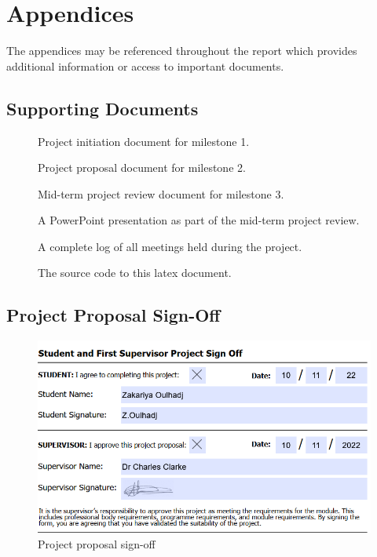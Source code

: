 \documentclass[11pt]{article}
\begin{document}
\clearpage



\clearpage
\section{Appendices}
The appendices may be referenced throughout the report which provides additional
information or access to important documents.

\subsection{Supporting Documents} \label{supporting_documents}
\begin{description}
  \item[] 
    Project initiation document for milestone 1.
  \item[]
    Project proposal document for milestone 2.
  \item[]
    Mid-term project review document for milestone 3.
  \item[]
    A PowerPoint presentation as part of the mid-term project review.
  \item[]
    A complete log of all meetings held during the project.
  \item[]
    The source code to this latex document.
\end{description}

\subsection{Project Proposal Sign-Off} \label{project_proposal}
\begin{figure}[H]
  \centering
  \includegraphics[width=\textwidth]{images/project_signoff.png}
  \caption{Project proposal sign-off}
  \label{fig:project_signoff}
\end{figure}
\end{document}
